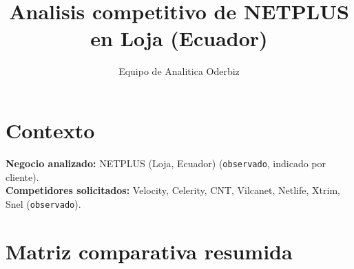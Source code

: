 \documentclass[9pt,a4paper,twocolumn,twoside]{tau-class/tau}
\title{Analisis competitivo de NETPLUS en Loja (Ecuador)}
\author[a,1]{Equipo de Analitica Oderbiz}
\affil[a]{Unidad de Inteligencia Comercial}
\begin{document}
\maketitle
\thispagestyle{firststyle}

\section{Contexto}
\textbf{Negocio analizado:} NETPLUS (Loja, Ecuador) (\texttt{observado}, indicado por cliente).\\
\textbf{Competidores solicitados:} Velocity, Celerity, CNT, Vilcanet, Netlife, Xtrim, Snel (\texttt{observado}).

\section{Matriz comparativa resumida}
\end{document}
